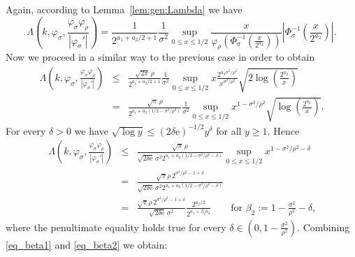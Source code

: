 \documentclass[namedate,webpdf,imanum]{ima-authoring-arxiv}%
\theoremstyle{thmstyletwo}%
\numberwithin{equation}{section}
\begin{document}
%
Again, according to Lemma~\ref{lem:gen:Lambda} we have
\begin{equation*}
\Lambda\left(k,\varphi_\sigma, \frac{\varphi_{\sigma} \varphi_{\rho}}{|\varphi_{\sigma}'|}\right) = \frac{1}{2^{a_1+a_2/2+1}} \frac{1}{\sigma^2}\sup_{0 \le x \le 1/2} \frac{x}{\varphi_\rho(\Phi_{\sigma}^{-1}(\frac{x}{2^{a_2}}))} \left|\Phi_{\sigma}^{-1}\left(\frac{x}{2^{a_2}}\right)\right|.
\end{equation*}
Now we proceed in a similar way to the previous case in order to obtain 
\begin{eqnarray*}
\Lambda\left(k,\varphi_\sigma, \frac{\varphi_{\sigma} \varphi_{\rho}}{|\varphi_{\sigma}'|}\right) & \le & \frac{\sqrt{2 \pi}\, \rho}{2^{a_1+a_2/2+1}} \frac{1}{\sigma^2} \sup_{0 \le x \le 1/2} x \frac{2^{a_2 \sigma^2/\rho^2}}{x^{\sigma^2/\rho^2}} \sqrt{2 \log \left(\frac{2^{a_2}}{x}\right)}\\
& = & \frac{\sqrt{\pi} \, \rho}{2^{a_1+a_2(1/2-\sigma^2/\rho^2)}} \frac{1}{\sigma^2} \sup_{0 \le x \le 1/2} x^{1-\sigma^2/\rho^2} \sqrt{\log \left(\frac{2^{a_2}}{x}\right)}.
\end{eqnarray*}
For every $\delta>0$ we have $\sqrt{\log y} \le (2 \delta \mathrm{e})^{-1/2} y^{\delta}$ for all $y \ge 1$. Hence
\begin{eqnarray}\label{eq_beta2}
\Lambda\left(k,\varphi_{\sigma},\frac{\varphi_{\sigma} \varphi_{\rho}}{|\varphi_{\sigma}'|}\right) & \le & \frac{ \sqrt{\pi} \, \rho}{\sqrt{2 \delta \mathrm{e} }  \, \sigma^2 2^{a_1+a_2(1/2-\sigma^2/\rho^2-\delta)}} \sup_{0 \le x \le 1/2} x^{1-\sigma^2/\rho^2-\delta}\nonumber\\ 
& = & \frac{ \sqrt{\pi} \rho \, 2^{\sigma^2/\rho^2-1+\delta}}{ \sqrt{2\delta \mathrm{e}} \, \sigma^2 2^{a_1+a_2(1/2-\sigma^2/\rho^2-\delta)}}\nonumber\\
& = & \frac{ \sqrt{\pi} \rho \, 2^{\sigma^2/\rho^2-1+\delta}}{ \sqrt{2 \delta \mathrm{e}} \, \sigma^2} \frac{2^{a_2/2}}{2^{a_1+\beta_2 a_2}} \qquad \mbox{for $\beta_2:=1-\frac{\sigma^2}{\rho^2}-\delta$,}
\end{eqnarray}
where the penultimate equality holds true for every $\delta \in (0,1-\frac{\sigma^2}{\rho^2})$. 
%
Combining \eqref{eq_beta1} and \eqref{eq_beta2} we obtain: %
\end{document}
